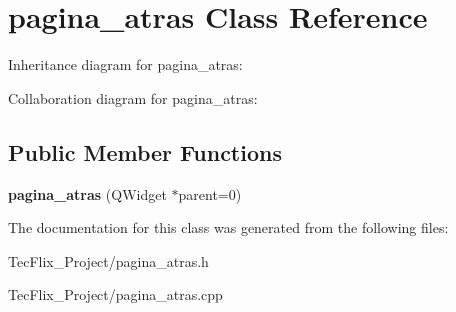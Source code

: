 \hypertarget{classpagina__atras}{}\section{pagina\+\_\+atras Class Reference}
\label{classpagina__atras}


Inheritance diagram for pagina\+\_\+atras\+:


Collaboration diagram for pagina\+\_\+atras\+:
\subsection*{Public Member Functions}
\begin{DoxyCompactItemize}
\item 
\mbox{\label{classpagina__atras_a02bb2c977b882acd46200983948f1e31}} 
{\bfseries pagina\+\_\+atras} (Q\+Widget $\ast$parent=0)
\end{DoxyCompactItemize}


The documentation for this class was generated from the following files\+:\begin{DoxyCompactItemize}
\item 
Tec\+Flix\+\_\+\+Project/pagina\+\_\+atras.\+h\item 
Tec\+Flix\+\_\+\+Project/pagina\+\_\+atras.\+cpp\end{DoxyCompactItemize}
